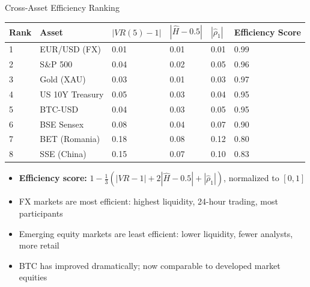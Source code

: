 \documentclass[9pt, aspectratio=169, t]{beamer}
\theoremstyle{definition}
\newenvironment{cminipage}[1]{%
    \par\noindent\hfill\begin{minipage}{#1}\ignorespaces
}{%
    \end{minipage}\hfill\null\par
}
\begin{document}
\begin{frame}{Cross-Asset Efficiency Ranking}
\begin{cminipage}{0.95\textwidth}
\small
\begin{center}
\footnotesize
\renewcommand{\arraystretch}{1.2}
\begin{tabular}{llllll}
\toprule
\textbf{Rank} & \textbf{Asset} & \textbf{$|VR(5)-1|$} & \textbf{$|\hat{H}-0.5|$} & \textbf{$|\hat{\rho}_1|$} & \textbf{Efficiency Score} \\
\midrule
1 & EUR/USD (FX) & 0.01 & 0.01 & 0.01 & 0.99 \\
2 & S\&P 500 & 0.04 & 0.02 & 0.05 & 0.96 \\
3 & Gold (XAU) & 0.03 & 0.01 & 0.03 & 0.97 \\
4 & US 10Y Treasury & 0.05 & 0.03 & 0.04 & 0.95 \\
5 & BTC-USD & 0.04 & 0.03 & 0.05 & 0.95 \\
6 & BSE Sensex & 0.08 & 0.04 & 0.07 & 0.90 \\
7 & BET (Romania) & 0.18 & 0.08 & 0.12 & 0.80 \\
8 & SSE (China) & 0.15 & 0.07 & 0.10 & 0.83 \\
\bottomrule
\end{tabular}
\end{center}

\vspace{0.1cm}
\begin{itemize}\setlength{\itemsep}{0pt}
    \item \textbf{Efficiency score:} $1 - \frac{1}{3}(|VR-1| + 2|\hat{H}-0.5| + |\hat{\rho}_1|)$, normalized to $[0,1]$
    \item FX markets are most efficient: highest liquidity, 24-hour trading, most participants
    \item Emerging equity markets are least efficient: lower liquidity, fewer analysts, more retail
    \item BTC has improved dramatically; now comparable to developed market equities
\end{itemize}
\end{cminipage}
\end{frame}
\end{document}
